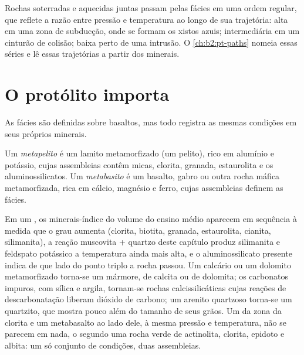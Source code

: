 Rochas soterradas e aquecidas juntas passam pelas fácies em uma ordem regular, que
reflete a razão entre pressão e temperatura ao longo de sua trajetória: alta em uma zona de
subducção, onde se formam os xistos azuis; intermediária em um cinturão de colisão; baixa perto de uma intrusão.
O \cref{ch:b2:pt-paths} nomeia essas séries e lê essas trajetórias a partir dos minerais.

\section{O protólito importa}\label{sec:b2:metamorphic-facies:protoliths}

As fácies são definidas sobre basaltos, mas todo  registra as mesmas condições em
seus próprios minerais.

\begin{definition}\label{def:b2:metamorphic-facies:protoliths}
Um \emph{metapelito} é um lamito metamorfizado (um pelito), rico em
alumínio e potássio, cujas assembleias contêm micas, clorita, granada, estaurolita e
os aluminossilicatos. Um \emph{metabasito} é um basalto,
gabro ou outra rocha máfica metamorfizada, rica em cálcio, magnésio e ferro, cujas assembleias definem
as fácies.
\end{definition}

Em um , os minerais-índice do volume do ensino médio aparecem em sequência à medida que
o grau aumenta (clorita, biotita, granada, estaurolita, cianita, silimanita), a
reação muscovita + quartzo deste capítulo produz silimanita e feldspato potássico a temperatura
ainda mais alta, e o aluminossilicato presente indica de que lado do ponto
triplo a rocha passou. Um calcário ou um dolomito metamorfizado torna-se um mármore, de calcita ou de
dolomita; os carbonatos impuros, com sílica e argila, tornam-se rochas calcissilicáticas cujas
reações de descarbonatação liberam dióxido de carbono; um arenito quartzoso torna-se um quartzito,
que mostra pouco além do tamanho de seus grãos. Um  da zona da clorita e um
metabasalto ao lado dele, à mesma pressão e temperatura, não se parecem em nada, o
segundo uma rocha verde de actinolita, clorita, epidoto e albita: um só conjunto de condições,
duas assembleias.

